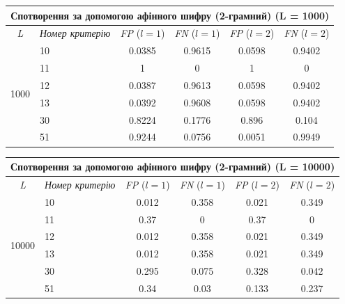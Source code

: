 \documentclass[a4paper,12pt]{article}
\begin{document}
\begin{center}
\renewcommand{\arraystretch}{1.2}
\setlength{\tabcolsep}{6pt}
\begin{tabular}{|c|l||c|c||c|c|}
\hline
\multicolumn{6}{|c|}{Спотворення за допомогою афінного шифру (2-грамний) (L = 1000)} \\
\hline
\textit{L} & \textit{Номер критерію} & \textit{FP} ($l=1$) & \textit{FN} ($l=1$) & \textit{FP} ($l=2$) & \textit{FN} ($l=2$) \\
\hline
\multirow{6}{*}{1000} & 10 & 0.0385 & 0.9615 & 0.0598 & 0.9402 \\
 & 11 & 1 & 0 & 1 & 0 \\
 & 12 & 0.0387 & 0.9613 & 0.0598 & 0.9402 \\
 & 13 & 0.0392 & 0.9608 & 0.0598 & 0.9402 \\
 & 30 & 0.8224 & 0.1776 & 0.896 & 0.104 \\
 & 51 & 0.9244 & 0.0756 & 0.0051 & 0.9949 \\
\hline
\end{tabular}
\end{center}

\begin{center}
\renewcommand{\arraystretch}{1.2}
\setlength{\tabcolsep}{6pt}
\begin{tabular}{|c|l||c|c||c|c|}
\hline
\multicolumn{6}{|c|}{Спотворення за допомогою афінного шифру (2-грамний) (L = 10000)} \\
\hline
\textit{L} & \textit{Номер критерію} & \textit{FP} ($l=1$) & \textit{FN} ($l=1$) & \textit{FP} ($l=2$) & \textit{FN} ($l=2$) \\
\hline
\multirow{6}{*}{10000} & 10 & 0.012 & 0.358 & 0.021 & 0.349 \\
 & 11 & 0.37 & 0 & 0.37 & 0 \\
 & 12 & 0.012 & 0.358 & 0.021 & 0.349 \\
 & 13 & 0.012 & 0.358 & 0.021 & 0.349 \\
 & 30 & 0.295 & 0.075 & 0.328 & 0.042 \\
 & 51 & 0.34 & 0.03 & 0.133 & 0.237 \\
\hline
\end{tabular}
\end{center}
\end{document}
